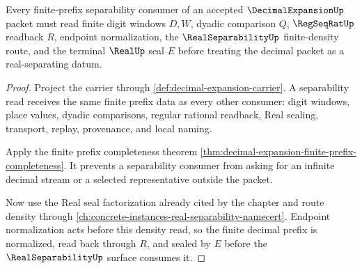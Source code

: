 \begin{theorem}
\label{thm:decimal-expansion-finite-prefix-separability-route}
Every finite-prefix separability consumer of an accepted $\DecimalExpansionUp$ packet must read finite digit windows $D,W$, dyadic comparison $Q$, $\RegSeqRatUp$ readback $R$, endpoint normalization, the $\RealSeparabilityUp$ finite-density route, and the terminal $\RealUp$ seal $E$ before treating the decimal packet as a real-separating datum.
\end{theorem}
\begin{proof}
Project the carrier through \autoref{def:decimal-expansion-carrier}. A separability read receives the same finite prefix data as every other consumer: digit windows, place values, dyadic comparisons, regular rational readback, Real sealing, transport, replay, provenance, and local naming.

Apply the finite prefix completeness theorem \autoref{thm:decimal-expansion-finite-prefix-completeness}. It prevents a separability consumer from asking for an infinite decimal stream or a selected representative outside the packet.

Now use the Real seal factorization already cited by the chapter and route density through \autoref{ch:concrete-instances-real-separability-namecert}. Endpoint normalization acts before this density read, so the finite decimal prefix is normalized, read back through $R$, and sealed by $E$ before the $\RealSeparabilityUp$ surface consumes it.
\end{proof}


